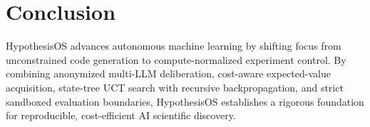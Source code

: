 \documentclass[10pt,twocolumn,3p,times]{article}
\begin{document}
\begin{table}[h]
\centering
\caption{Phased development roadmap and resource allocation.}
\label{tab:roadmap}
\small
{}
\end{table}

\section{Conclusion}
\label{sec:conclusion}

HypothesisOS advances autonomous machine learning by shifting focus from unconstrained code generation to compute-normalized experiment control. By combining anonymized multi-LLM deliberation, cost-aware expected-value acquisition, state-tree UCT search with recursive backpropagation, and strict sandboxed evaluation boundaries, HypothesisOS establishes a rigorous foundation for reproducible, cost-efficient AI scientific discovery.
\end{document}

